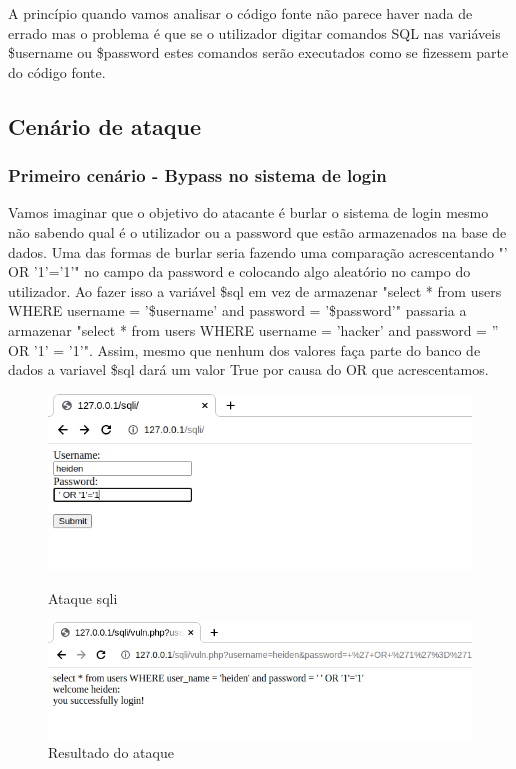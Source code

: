 \documentclass{report}
\begin{document}
A princípio quando vamos analisar o código fonte não parece haver nada de errado mas o problema é que se o utilizador digitar comandos SQL nas variáveis \$username ou \$password estes comandos serão executados como se fizessem parte do código fonte.

\subsection{Cenário de ataque}

\subsubsection{Primeiro cenário - Bypass no sistema de login}

Vamos imaginar que o objetivo do atacante é burlar o sistema de login mesmo não sabendo qual é o utilizador ou a password que estão armazenados na base de dados. Uma das formas de burlar seria fazendo uma comparação acrescentando "' OR '1'='1'" no campo da password e colocando algo aleatório no campo do utilizador. Ao fazer isso a variável \$sql em vez de armazenar "select * from users WHERE user\textunderscore name = '\$username' and password = '\$password'" passaria a armazenar "select * from users WHERE user\textunderscore name = 'hacker' and password = '' OR '1' = '1'". Assim, mesmo que nenhum dos valores faça parte do banco de dados a variavel \$sql dará um valor True por causa do OR que acrescentamos.

\begin{figure}[!htb]
  \includegraphics[width=\linewidth]{imagessql/Fig3.png}
  \caption{Ataque \ac{sqli}}\label{fig:ataque sqli}
\endminipage\hfill
{}
  \includegraphics[width=\linewidth]{imagessql/Fig4.png}
  \caption{Resultado do ataque}\label{fig:resultado do ataque}
\endminipage
\end{figure}
\end{document}
